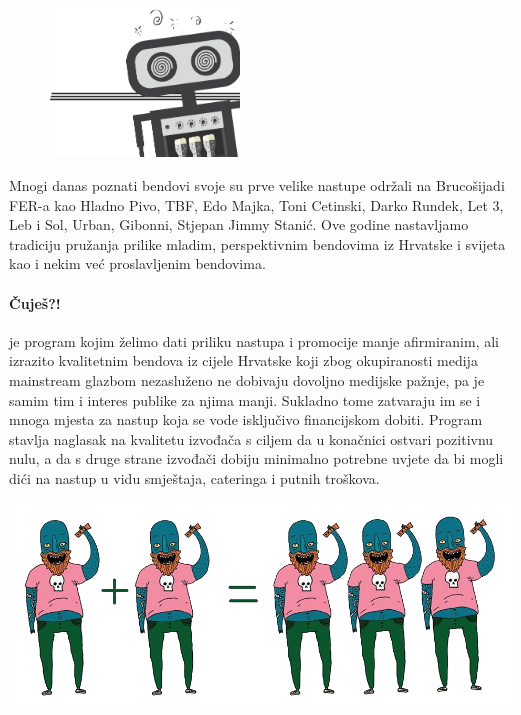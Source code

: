 \documentclass[12pt,a4paper,oneside]{article}
\begin{document}
	\begin{figure}
		\vspace{-15mm}
		\begin{flushright}
			\includegraphics[width=0.45\textwidth]{ZARI.png}
		\end{flushright}
		\vspace{-15mm}
	\end{figure}
	
	\noindent Mnogi danas poznati bendovi svoje su prve velike nastupe održali na Brucošijadi FER-a
	kao Hladno Pivo, TBF, Edo Majka, Toni Cetinski, Darko Rundek, Let 3, Leb i Sol, Urban,
	Gibonni, Stjepan Jimmy Stanić. Ove godine nastavljamo tradiciju pružanja prilike
	mladim, perspektivnim bendovima iz Hrvatske i svijeta kao i nekim već proslavljenim
	bendovima.

	\vspace{1cm}
	
	\paragraph{Čuješ?!}je program kojim želimo dati priliku nastupa i promocije manje afirmiranim, ali izrazito kvalitetnim bendova iz cijele Hrvatske koji zbog okupiranosti medija mainstream glazbom nezasluženo ne dobivaju dovoljno medijske pažnje, pa je samim tim i interes publike za njima manji. Sukladno tome zatvaraju im se i mnoga mjesta za nastup koja se vode isključivo financijskom dobiti. Program stavlja naglasak na kvalitetu izvođača s ciljem da u konačnici ostvari pozitivnu nulu, a da s druge strane izvođači dobiju minimalno potrebne uvjete da bi mogli dići na nastup u vidu smještaja, cateringa i putnih troškova.
	
	\vspace{1cm}
	\includegraphics[scale=0.5]{cujes.png}
	
\end{document}
